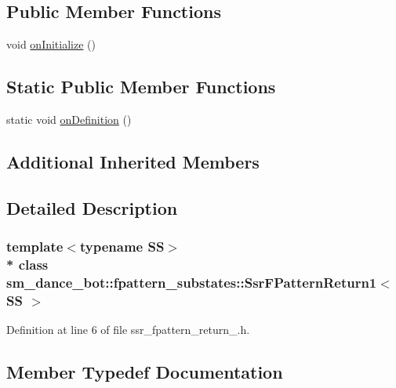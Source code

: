\subsection*{Public Member Functions}
\begin{DoxyCompactItemize}
\item 
void \hyperlink{structsm__dance__bot_1_1fpattern__substates_1_1SsrFPatternReturn1_a2de2d855cb252cde254768d37ca8cf26}{on\+Initialize} ()
\end{DoxyCompactItemize}
\subsection*{Static Public Member Functions}
\begin{DoxyCompactItemize}
\item 
static void \hyperlink{structsm__dance__bot_1_1fpattern__substates_1_1SsrFPatternReturn1_a331e28b2d11f295963640a73545bceb2}{on\+Definition} ()
\end{DoxyCompactItemize}
\subsection*{Additional Inherited Members}


\subsection{Detailed Description}
\subsubsection*{template$<$typename SS$>$\\*
class sm\+\_\+dance\+\_\+bot\+::fpattern\+\_\+substates\+::\+Ssr\+F\+Pattern\+Return1$<$ S\+S $>$}



Definition at line 6 of file ssr\+\_\+fpattern\+\_\+return\+\_.\+h.



\subsection{Member Typedef Documentation}
